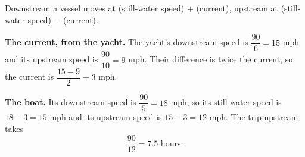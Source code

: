 Downstream a vessel moves at (still-water speed) $+$ (current), upstream at (still-water speed) $-$ (current).

\textbf{The current, from the yacht.} The yacht's downstream speed is $\dfrac{90}{6}=15$ mph and its upstream speed is $\dfrac{90}{10}=9$ mph. Their difference is twice the current, so the current is $\dfrac{15-9}{2}=3$ mph.

\textbf{The boat.} Its downstream speed is $\dfrac{90}{5}=18$ mph, so its still-water speed is $18-3=15$ mph and its upstream speed is $15-3=12$ mph. The trip upstream takes
\[
\dfrac{90}{12}=\boxed{7.5\text{ hours}}.
\]
